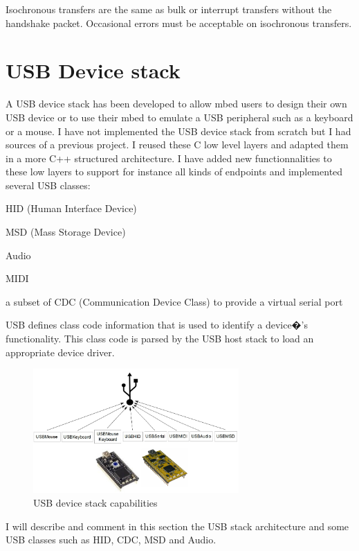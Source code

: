 \documentclass[pdftex,10pt,a4paper]{report}
\newenvironment{packed_item}{
\begin{itemize}
  \setlength{\itemsep}{1pt}
  \setlength{\parskip}{0pt}
  \setlength{\parsep}{0pt}
}{\end{itemize}}
\begin{document}
Isochronous transfers are the same as bulk or interrupt transfers without the handshake packet. Occasional errors must be acceptable on isochronous transfers.



\newpage
\section{USB Device stack}
A USB device stack has been developed to allow mbed users to design their own USB device or to use their mbed to emulate a USB peripheral such as a keyboard or a mouse. I have not implemented the USB device stack from scratch but I had sources of a previous project. I reused these C low level layers and adapted them in a more C++ structured architecture. I have added new functionnalities to these low layers to support for instance all kinds of endpoints and implemented several USB classes:
\begin{packed_item}
	\item HID (Human Interface Device)
	\item MSD (Mass Storage Device)
	\item Audio
	\item MIDI
	\item a subset of CDC (Communication Device Class) to provide a virtual serial port
\end{packed_item}

USB defines class code information that is used to identify a device�'s functionality. This class code is parsed by the USB host stack to load an appropriate device driver.

\begin{figure}[h!]
		\centering
		\includegraphics[width=0.7\textwidth]{./usb_capa1.jpg}
		\caption{USB device stack capabilities}
		\label{USB device stack capabilities}
\end{figure}

I will describe and comment in this section the USB stack architecture and some USB classes such as HID, CDC, MSD and Audio.
\end{document}
